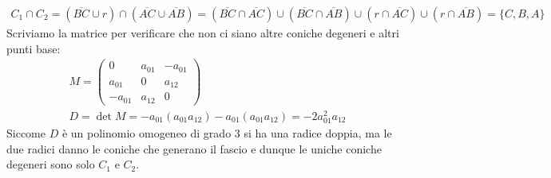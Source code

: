 \begin{demonstration}
		\begin{gather*}
			C_1\cap C_2 = (\overline{BC}\cup r) \cap (\overline{AC}\cup\overline{AB})=(\overline{BC}\cap\overline{AC}) \cup (\overline{BC}\cap\overline{AB}) \cup (r\cap\overline{AC}) \cup (r\cap\overline{AB}) =\{ C,B,A \}
		\end{gather*}
	Scriviamo la matrice per verificare che non ci siano altre coniche degeneri e altri punti base:
		\begin{gather*}
			M=\begin{pmatrix}
				0 & a_{01} & -a_{01}\\
				a_{01} & 0 & a_{12}\\
				-a_{01} & a_{12} & 0
			\end{pmatrix}\\
			D=\det M= -a_{01}(a_{01}a_{12}) -a_{01}(a_{01}a_{12}) = -2a_{01}^2 a_{12}
		\end{gather*}
	Siccome $D$ è un polinomio omogeneo di grado 3 si ha una radice doppia, ma le due radici danno le coniche che generano il fascio e dunque le uniche coniche degeneri sono solo $C_1$ e $C_2$.
\end{demonstration}

